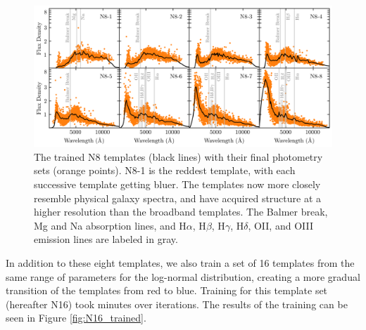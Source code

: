 \begin{figure}
    \centering
    \includegraphics{figures/N8_trained.png}
    \caption{The trained N8 templates (black lines) with their final photometry sets (orange points). N8-1 is the reddest template, with each successive template getting bluer. The templates now more closely resemble physical galaxy spectra, and have acquired structure at a higher resolution than the broadband templates. The Balmer break, Mg and Na absorption lines, and H$\alpha$, H$\beta$, H$\gamma$, H$\delta$, OII, and OIII emission lines are labeled in gray.}
    \label{fig:N8_trained}
\end{figure}

In addition to these eight templates, we also train a set of 16 templates from the same range of parameters for the log-normal distribution, creating a more gradual transition of the templates from red to blue. 
Training for this template set (hereafter N16) took  minutes over  iterations.
The results of the training can be seen in Figure \ref{fig:N16_trained}.

